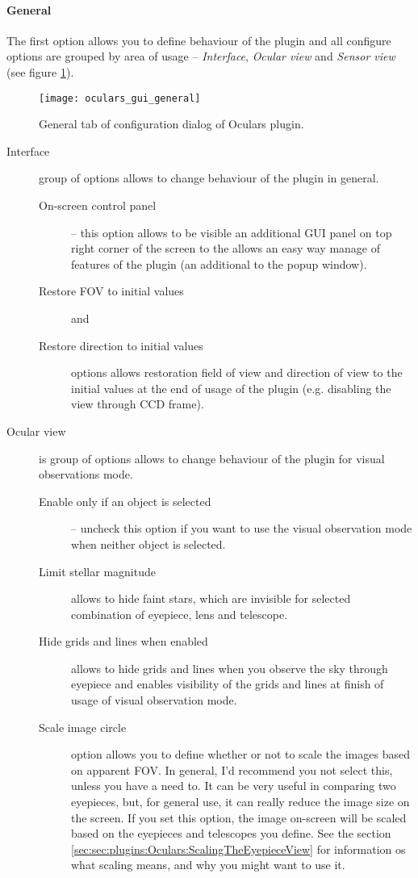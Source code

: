 \paragraph{General}

The first option allows you to define behaviour of the plugin and all configure options are grouped by area of usage -- \emph{Interface}, \emph{Ocular view} and \emph{Sensor view} (see figure \ref{fig:plugins:Oculars:Gui:General}).

\begin{figure}[ht]\centering
\texttt{[image: oculars\_gui\_general]}
\caption{General tab of configuration dialog of Oculars plugin.}
\label{fig:plugins:Oculars:Gui:General}
\end{figure}

\begin{description}
\item[Interface] group of options allows to change behaviour of the plugin in general.
 \begin{description}
   \item[On-screen control panel] -- this option allows to be visible an additional GUI panel on top right corner of the screen to the allows an easy way manage of features of the plugin (an additional to the popup window).
   \item[Restore FOV to initial values] and
   \item[Restore direction to initial values] options allows restoration field of view and direction of view to the initial values at the end of usage of the plugin (e.g. disabling the view through CCD frame).
 \end{description}
\item[Ocular view] is group of options allows to change behaviour of the plugin for visual observations mode.
 \begin{description}
   \item[Enable only if an object is selected] -- uncheck this option if you want to use the visual observation mode when neither object is selected.
   \item[Limit stellar magnitude] allows to hide faint stars, which are invisible for selected combination of eyepiece, lens and telescope.
   \item[Hide grids and lines when enabled] allows to hide grids and lines when you observe the sky through eyepiece and enables visibility of the grids and lines at finish of usage of visual observation mode.
   \item[Scale image circle] option allows you to define whether or not to scale the images based on apparent FOV. In general, I'd recommend you not select this, unless you have a need to. It can be very useful in comparing two eyepieces, but, for general use, it can really reduce the image size on the screen. If you set this option, the image on-screen will be scaled based on the eyepieces and telescopes you define. See the section \ref{sec:sec:plugins:Oculars:ScalingTheEyepieceView} for information os what scaling means, and why you might want to use it.

\end{description}
\end{description}
